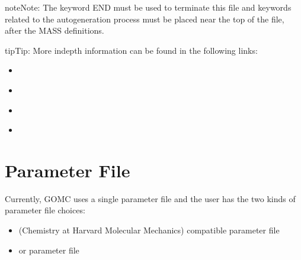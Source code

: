 \documentclass[letterpaper,10pt,english]{sphinxmanual}
\begin{document}
\begin{sphinxadmonition}{note}{Note:}
\sphinxAtStartPar
The keyword END must be used to terminate this file and keywords related to the auto\sphinxhyphen{}generation process must be placed near the top of the file, after the MASS definitions.
\end{sphinxadmonition}

\begin{sphinxadmonition}{tip}{Tip:}
\sphinxAtStartPar
More in\sphinxhyphen{}depth information can be found in the following links:
\begin{itemize}
\item {} 
\sphinxAtStartPar
{}

\end{itemize}
\begin{itemize}
\item {} 
\sphinxAtStartPar
{}

\end{itemize}
\begin{itemize}
\item {} 
\sphinxAtStartPar
{}

\end{itemize}
\begin{itemize}
\item {} 
\sphinxAtStartPar
{}

\end{itemize}
\end{sphinxadmonition}


\section{Parameter File}
\label{\detokenize{input_file:parameter-file}}
\sphinxAtStartPar
Currently, GOMC uses a single parameter file and the user has the two kinds of parameter file choices:
\begin{itemize}
\item {} 
\sphinxAtStartPar
{} (Chemistry at Harvard Molecular Mechanics) compatible parameter file

\item {} 
\sphinxAtStartPar
{} or  parameter file

\end{itemize}
\end{document}
